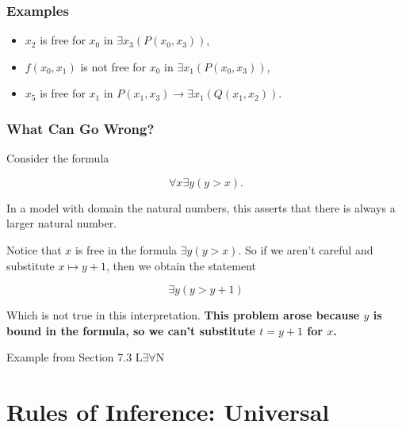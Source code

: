 \documentclass{beamer}
\theoremstyle{indentDefn} \newtheorem{defn}[]{Definition}
\begin{document}
\begin{frame}
	\frametitle{Examples}

	

	\begin{itemize}
		\item[]	$x_{2}$ is free for $x_{0}$ in $\exists x_{3} (P(x_{0},x_{3}))$, \vspace{0.2cm}
		\item[] $f(x_{0},x_{1})$ is not free for $x_{0}$ in $\exists x_{1} (P(x_{0},x_{3}))$, \vspace{0.2cm}
		\item[] $x_{5}$ is free for $x_{1}$ in $P(x_{1},x_{3})\rightarrow \exists x_{1} (Q(x_{1},x_{2}))$.
	\end{itemize}	

	
\end{frame}

\begin{frame}
	\frametitle{What Can Go Wrong?}
	
	Consider the formula 
	
	$$\forall x \exists y (y > x).$$
	
	In a model with domain the natural numbers, this asserts that there is always a larger natural number. 
	
	\vspace{0.5cm}
	
	Notice that $x$ is free in the formula $\exists y (y > x)$. So if we aren't careful and substitute $x \mapsto y+1$, then we obtain the statement 
	
	$$ \exists y (y > y+1)$$
	
	Which is not true in this interpretation. {\bf This problem arose because $y$ is bound in the formula, so we can't substitute $t=y+1$ for $x$.}
	
	\vspace{0.5cm}
	
	\footnotesize{Example from Section 7.3 L$\exists\forall$N}
	
\end{frame}

\section{Rules of Inference: Universal}
\end{document}
